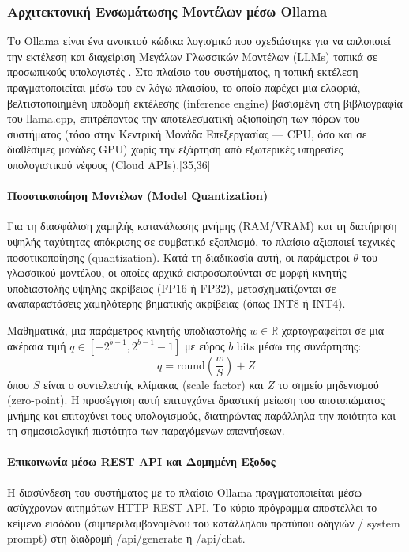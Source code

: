 \documentclass[twoside, a4paper, 11pt]{article}
\newcommand{\textlatin}[1]{\textenglish{#1}}
\begin{document}
\subsubsection{Αρχιτεκτονική Ενσωμάτωσης Μοντέλων μέσω Ollama}

Το \textlatin{Ollama} είναι ένα ανοικτού κώδικα λογισμικό που σχεδιάστηκε για να απλοποιεί την εκτέλεση και διαχείριση Μεγάλων Γλωσσικών Μοντέλων (\textlatin{LLMs}) τοπικά σε προσωπικούς υπολογιστές \cite{ollama2023}. Στο πλαίσιο του συστήματος, η τοπική εκτέλεση πραγματοποιείται μέσω του εν λόγω πλαισίου, το οποίο παρέχει μια ελαφριά, βελτιστοποιημένη υποδομή εκτέλεσης (\textlatin{inference engine}) βασισμένη στη βιβλιογραφία του \textlatin{llama.cpp}, επιτρέποντας την αποτελεσματική αξιοποίηση των πόρων του συστήματος (τόσο στην Κεντρική Μονάδα Επεξεργασίας — \textlatin{CPU}, όσο και σε διαθέσιμες μονάδες \textlatin{GPU}) χωρίς την εξάρτηση από εξωτερικές υπηρεσίες υπολογιστικού νέφους (\textlatin{Cloud APIs}).[35,36]

\paragraph{Ποσοτικοποίηση Μοντέλων (\textlatin{Model Quantization})}
Για τη διασφάλιση χαμηλής κατανάλωσης μνήμης (\textlatin{RAM/VRAM}) και τη διατήρηση υψηλής ταχύτητας απόκρισης σε συμβατικό εξοπλισμό, το πλαίσιο αξιοποιεί τεχνικές ποσοτικοποίησης (\textlatin{quantization}). Κατά τη διαδικασία αυτή, οι παράμετροι $\theta$ του γλωσσικού μοντέλου, οι οποίες αρχικά εκπροσωπούνται σε μορφή κινητής υποδιαστολής υψηλής ακρίβειας (\textlatin{FP16} ή \textlatin{FP32}), μετασχηματίζονται σε αναπαραστάσεις χαμηλότερης βηματικής ακρίβειας (όπως \textlatin{INT8} ή \textlatin{INT4}).

Μαθηματικά, μια παράμετρος κινητής υποδιαστολής $w \in \mathbb{R}$ χαρτογραφείται σε μια ακέραια τιμή $q \in [-2^{b-1}, 2^{b-1}-1]$ με εύρος $b$ bits μέσω της συνάρτησης:
\begin{equation}
q = \text{round}\left( \frac{w}{S} \right) + Z
\end{equation}
όπου $S$ είναι ο συντελεστής κλίμακας (\textlatin{scale factor}) και $Z$ το σημείο μηδενισμού (\textlatin{zero-point}). Η προσέγγιση αυτή επιτυγχάνει δραστική μείωση του αποτυπώματος μνήμης και επιταχύνει τους υπολογισμούς, διατηρώντας παράλληλα την ποιότητα και τη σημασιολογική πιστότητα των παραγόμενων απαντήσεων.

\paragraph{Επικοινωνία μέσω \textlatin{REST API} και Δομημένη Έξοδος}
Η διασύνδεση του συστήματος με το πλαίσιο \textlatin{Ollama} πραγματοποιείται μέσω ασύγχρονων αιτημάτων \textlatin{HTTP REST API}. Το κύριο πρόγραμμα αποστέλλει το κείμενο εισόδου (συμπεριλαμβανομένου του κατάλληλου προτύπου οδηγιών / \textlatin{system prompt}) στη διαδρομή \textlatin{/api/generate} ή \textlatin{/api/chat}.
\end{document}
